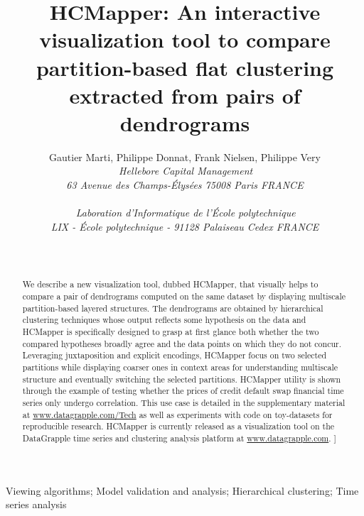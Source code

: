 \documentclass[10pt,conference,a4paper]{IEEEtran}
\title{\textbf{HCMapper}: An interactive visualization tool to compare partition-based
flat clustering extracted from pairs of dendrograms}
\author{{Gautier Marti{\small }, Philippe Donnat{\small }, Frank Nielsen{\small }, Philippe Very{\small } } {}
\vspace{1.6mm}\\
\fontsize{10}{10}\selectfont\itshape
\,Hellebore Capital Management\\ 63 Avenue des Champs-\'Elys\'ees 75008 Paris FRANCE\\ \,\\ 
\,Laboration d'Informatique de l'\'Ecole polytechnique\\ LIX - \'Ecole polytechnique - 91128 Palaiseau Cedex FRANCE\\ \\
\fontsize{9}{9}\selectfont\ttfamily\upshape
\fontsize{10}{10}\selectfont\rmfamily\itshape
\fontsize{9}{9}\selectfont\ttfamily\upshape
\,
}
\begin{document}
\maketitle

\begin{figure}[b]
\parbox{\hsize}{\em


}\end{figure}


\begin{abstract}
We describe a new visualization tool, dubbed HCMapper, that visually helps
to compare a pair of dendrograms computed on the same dataset by displaying multiscale partition-based layered structures.
The dendrograms are obtained by hierarchical clustering techniques whose output reflects some hypothesis on the data and HCMapper
is specifically designed to grasp at first glance both whether the two compared hypotheses broadly agree and the data points on which they do not concur.
Leveraging juxtaposition and explicit encodings, HCMapper focus on two selected partitions while displaying coarser ones in context areas for
understanding multiscale structure and eventually switching the selected partitions.
HCMapper utility is shown through the example of testing whether the prices of credit default swap financial time series only undergo correlation.
This use case is detailed in the supplementary material at \url{www.datagrapple.com/Tech} as well as experiments with code on toy-datasets for reproducible research.
HCMapper is currently released as a visualization tool on the DataGrapple time series and clustering analysis platform at \url{www.datagrapple.com}.
\1\baselineskip]
\end{abstract}


\begin{keywords}
Viewing algorithms; Model validation and analysis; Hierarchical clustering; Time series analysis
\end{keywords}
\end{document}
